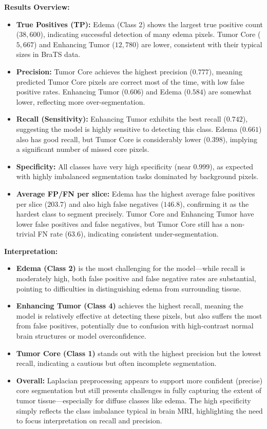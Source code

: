 \textbf{Results Overview:}
\begin{itemize}
    \item \textbf{True Positives (TP):} Edema (Class 2) shows the largest true positive count ($38,600$), indicating successful detection of many edema pixels. Tumor Core ($5,667$) and Enhancing Tumor ($12,780$) are lower, consistent with their typical sizes in BraTS data.
    
    \item \textbf{Precision:} Tumor Core achieves the highest precision ($0.777$), meaning predicted Tumor Core pixels are correct most of the time, with low false positive rates. Enhancing Tumor ($0.606$) and Edema ($0.584$) are somewhat lower, reflecting more over-segmentation.
    
    \item \textbf{Recall (Sensitivity):} Enhancing Tumor exhibits the best recall ($0.742$), suggesting the model is highly sensitive to detecting this class. Edema ($0.661$) also has good recall, but Tumor Core is considerably lower ($0.398$), implying a significant number of missed core pixels.
    
    \item \textbf{Specificity:} All classes have very high specificity (near $0.999$), as expected with highly imbalanced segmentation tasks dominated by background pixels.
    
    \item \textbf{Average FP/FN per slice:} Edema has the highest average false positives per slice ($203.7$) and also high false negatives ($146.8$), confirming it as the hardest class to segment precisely. Tumor Core and Enhancing Tumor have lower false positives and false negatives, but Tumor Core still has a non-trivial FN rate ($63.6$), indicating consistent under-segmentation.
\end{itemize}

\textbf{Interpretation:}
\begin{itemize}
    \item \textbf{Edema (Class 2)} is the most challenging for the model—while recall is moderately high, both false positive and false negative rates are substantial, pointing to difficulties in distinguishing edema from surrounding tissue.
    \item \textbf{Enhancing Tumor (Class 4)} achieves the highest recall, meaning the model is relatively effective at detecting these pixels, but also suffers the most from false positives, potentially due to confusion with high-contrast normal brain structures or model overconfidence.
    \item \textbf{Tumor Core (Class 1)} stands out with the highest precision but the lowest recall, indicating a cautious but often incomplete segmentation.
    \item \textbf{Overall:} Laplacian preprocessing appears to support more confident (precise) core segmentation but still presents challenges in fully capturing the extent of tumor tissue—especially for diffuse classes like edema. The high specificity simply reflects the class imbalance typical in brain MRI, highlighting the need to focus interpretation on recall and precision.
\end{itemize}


